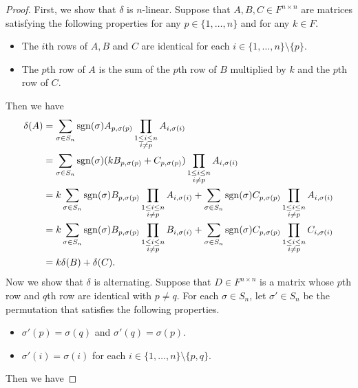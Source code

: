 \begin{proof}
  First, we show that $\delta$ is $n$-linear.
  Suppose that $A, B, C \in F^{n \times n}$ are matrices satisfying the
  following properties for any $p \in \{1, \dots, n\}$ and for any $k \in F$.
  \begin{itemize}
    \item The $i$th rows of $A, B$ and $C$ are identical for each
    $i \in \{1, \dots, n\} \setminus \{p\}$.
    \item The $p$th row of $A$ is the sum of the $p$th row of $B$ multiplied by
    $k$ and the $p$th row of $C$.
  \end{itemize}
  Then we have
  \begin{align*}
    \delta(A)
    &= \sum_{\sigma \in S_n} \operatorname{sgn}(\sigma) A_{p,\sigma(p)}
    \prod_{\substack{1 \leq i \leq n \\ i \neq p}} A_{i,\sigma(i)} \\
    &= \sum_{\sigma \in S_n} \operatorname{sgn}(\sigma) (kB_{p,\sigma(p)} + C_{p,\sigma(p)})
    \prod_{\substack{1 \leq i \leq n \\ i \neq p}} A_{i,\sigma(i)} \\
    &= k\sum_{\sigma \in S_n} \operatorname{sgn}(\sigma) B_{p,\sigma(p)}
    \prod_{\substack{1 \leq i \leq n \\ i \neq p}} A_{i,\sigma(i)}
    + \sum_{\sigma \in S_n} \operatorname{sgn}(\sigma) C_{p,\sigma(p)}
    \prod_{\substack{1 \leq i \leq n \\ i \neq p}} A_{i,\sigma(i)} \\
    &= k\sum_{\sigma \in S_n} \operatorname{sgn}(\sigma) B_{p,\sigma(p)}
    \prod_{\substack{1 \leq i \leq n \\ i \neq p}} B_{i,\sigma(i)}
    + \sum_{\sigma \in S_n} \operatorname{sgn}(\sigma) C_{p,\sigma(p)}
    \prod_{\substack{1 \leq i \leq n \\ i \neq p}} C_{i,\sigma(i)} \\
    &= k\delta(B) + \delta(C).
  \end{align*}
  Now we show that $\delta$ is alternating.
  Suppose that $D \in F^{n \times n}$ is a matrix whose $p$th row and $q$th row
  are identical with $p \neq q$.
  For each $\sigma \in S_n$, let $\sigma' \in S_n$ be the permutation that
  satisfies the following properties.
  \begin{itemize}
    \item $\sigma'(p) = \sigma(q)$ and $\sigma'(q) = \sigma(p)$.
    \item $\sigma'(i) = \sigma(i)$ for each
    $i \in \{1, \dots, n\} \setminus \{p, q\}$.
  \end{itemize}
  Then we have

\end{proof}
